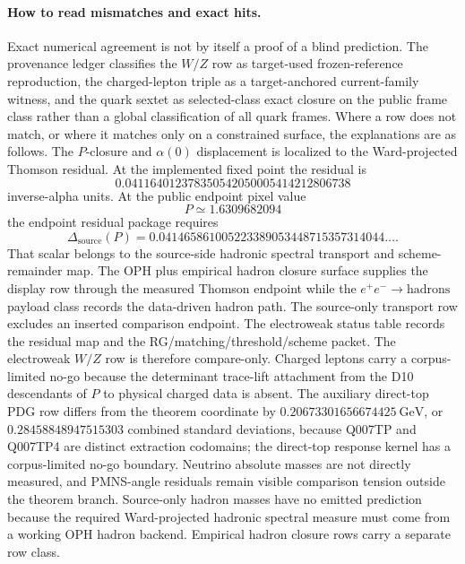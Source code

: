 \documentclass[11pt]{article}
\begin{document}
\paragraph{How to read mismatches and exact hits.}
Exact numerical agreement is not by itself a proof of a blind prediction. The provenance
ledger classifies the \(W/Z\) row as target-used frozen-reference reproduction, the charged-lepton
triple as a target-anchored current-family witness, and the quark sextet as selected-class exact
closure on the public frame class rather than a global classification of all quark frames. Where a
row does not match, or where it matches only on a constrained surface, the explanations are
as follows. The \(P\)-closure and \(\alpha(0)\) displacement is localized to the Ward-projected
Thomson residual. At the implemented fixed point the residual is
\[
0.041164012378350542050005414212806738
\]
inverse-alpha units. At the public endpoint pixel value
\[
P\simeq1.6309682094
\]
the endpoint residual package requires
\[
\Delta_{\mathrm{source}}(P)=0.041465861005223389053448715357314044\ldots.
\]
That scalar belongs to the source-side hadronic spectral transport and
scheme-remainder map. The OPH plus empirical hadron closure surface supplies
the display row through the measured Thomson endpoint while the
\(e^+e^-\to\mathrm{hadrons}\) payload class records the data-driven hadron
path. The source-only transport row excludes an inserted comparison endpoint. The
electroweak status table records the residual map and the
RG/matching/threshold/scheme packet.
The electroweak \(W/Z\) row is therefore compare-only. Charged leptons carry a corpus-limited
no-go because the determinant trace-lift attachment from the D10 descendants of \(P\) to physical charged data is absent. The auxiliary
direct-top PDG row differs from the theorem coordinate by \(0.20673301656674425~\mathrm{GeV}\),
or \(0.28458848947515303\) combined standard deviations, because Q007TP and Q007TP4 are distinct
extraction codomains; the direct-top response kernel has a corpus-limited no-go boundary. Neutrino absolute masses are
not directly measured, and PMNS-angle residuals remain visible comparison tension outside the
theorem branch. Source-only hadron masses have no emitted prediction because the
required Ward-projected hadronic spectral measure must come from a working OPH
hadron backend. Empirical hadron closure rows carry a separate row class.
\end{document}
